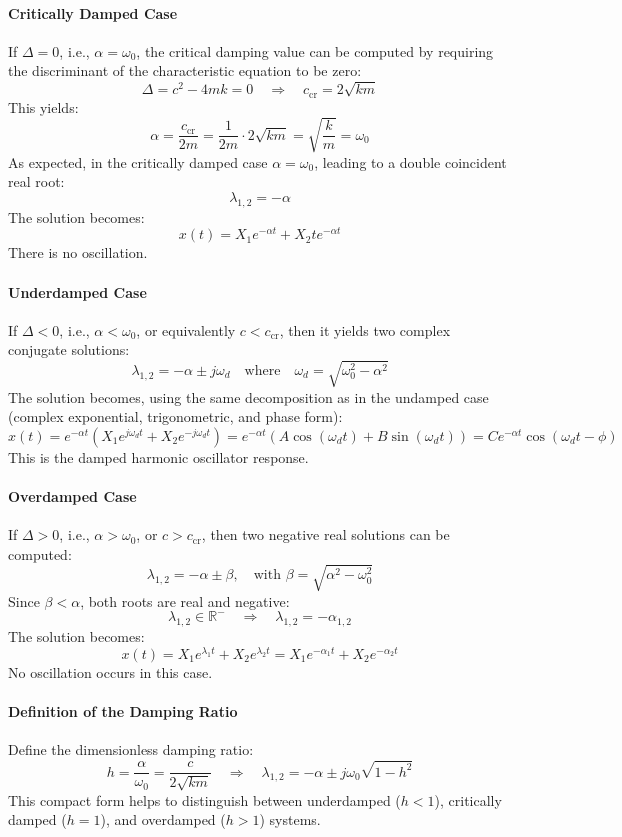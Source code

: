 \paragraph{Critically Damped Case} If \( \Delta = 0 \), i.e., \( \alpha = \omega_0 \), the critical damping value can be computed by requiring the discriminant of the characteristic equation to be zero:
\[
\Delta = c^2 - 4mk = 0 \quad \Rightarrow \quad c_{\text{cr}} = 2 \sqrt{km}
\]
This yields:
\[
\alpha = \frac{c_{\text{cr}}}{2m} = \frac{1}{2m} \cdot 2\sqrt{km} = \sqrt{\frac{k}{m}} = \omega_0
\]
As expected, in the critically damped case \( \alpha = \omega_0 \), leading to a double coincident real root:
\[
\lambda_{1,2} = -\alpha
\]
The solution becomes:
\[
x(t) = X_1 e^{-\alpha t} + X_2 t e^{-\alpha t}
\]
There is no oscillation. 

\paragraph{Underdamped Case} If \( \Delta < 0 \), i.e., \( \alpha < \omega_0 \), or equivalently \( c < c_{\text{cr}} \), then it yields two complex conjugate solutions:
\[
\lambda_{1,2} = -\alpha \pm j \omega_d \quad \text{where} \quad \omega_d = \sqrt{\omega_0^2 - \alpha^2}
\]
The solution becomes, using the same decomposition as in the undamped case (complex exponential, trigonometric, and phase form):
\[
x(t) = e^{-\alpha t} (X_1 e^{j \omega_d t} + X_2 e^{-j \omega_d t}) 
= e^{-\alpha t} (A \cos(\omega_d t) + B \sin(\omega_d t)) 
= C e^{-\alpha t} \cos(\omega_d t - \phi)
\]
This is the damped harmonic oscillator response.

\paragraph{Overdamped Case} If \( \Delta > 0 \), i.e., \( \alpha > \omega_0 \), or \( c > c_{\text{cr}} \), then two negative real solutions can be computed:
\[
\lambda_{1,2} = -\alpha \pm \beta, \quad \text{with } \beta = \sqrt{\alpha^2 - \omega_0^2}
\]
Since \( \beta < \alpha \), both roots are real and negative:
\[
\lambda_{1,2} \in \mathbb{R}^- \quad\Rightarrow \quad \lambda_{1,2} = -\alpha_{1,2}
\]
The solution becomes:
\[
x(t) = X_1 e^{\lambda_1 t} + X_2 e^{\lambda_2 t} = X_1 e^{-\alpha_1 t} + X_2 e^{-\alpha_2 t}
\]
No oscillation occurs in this case.

\paragraph{Definition of the Damping Ratio} Define the dimensionless damping ratio:
\[
h = \frac{\alpha}{\omega_0} = \frac{c}{2 \sqrt{km}}
\quad \Rightarrow \quad 
\lambda_{1,2} = -\alpha \pm j \omega_0 \sqrt{1 - h^2}
\]
This compact form helps to distinguish between underdamped (\( h < 1 \)), critically damped (\( h = 1 \)), and overdamped (\( h > 1 \)) systems.

